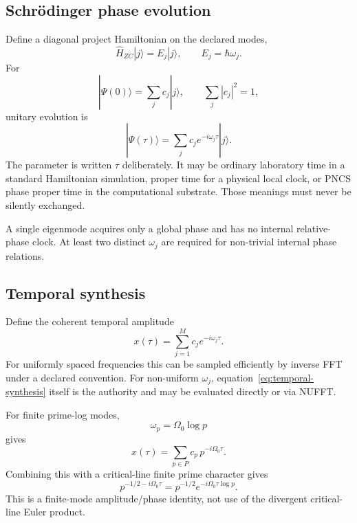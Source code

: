 \subsection{Schrödinger phase evolution}

Define a diagonal project Hamiltonian on the declared modes,
\begin{equation}
\boxed{\hat H_{ZC}|j\rangle=E_j|j\rangle,
\qquad E_j=\hbar\omega_j.}
\end{equation}
For
\begin{equation}
|\Psi(0)\rangle=\sum_j c_j|j\rangle,
\qquad\sum_j|c_j|^2=1,
\end{equation}
unitary evolution is
\begin{equation}
\boxed{
|\Psi(\tau)\rangle
=\sum_j c_j e^{-i\omega_j\tau}|j\rangle.
}
\label{eq:sch-evolution}
\end{equation}
The parameter is written \(\tau\) deliberately. It may be ordinary laboratory time in a standard Hamiltonian simulation, proper time for a physical local clock, or PNCS phase proper time in the computational substrate. Those meanings must never be silently exchanged.

A single eigenmode acquires only a global phase and has no internal relative-phase clock. At least two distinct \(\omega_j\) are required for non-trivial internal phase relations.

\subsection{Temporal synthesis}

Define the coherent temporal amplitude
\begin{equation}
\boxed{x(\tau)=\sum_{j=1}^{M}c_j e^{-i\omega_j\tau}.}
\label{eq:temporal-synthesis}
\end{equation}
For uniformly spaced frequencies this can be sampled efficiently by inverse FFT under a declared convention. For non-uniform \(\omega_j\), equation~\eqref{eq:temporal-synthesis} itself is the authority and may be evaluated directly or via NUFFT.

For finite prime-log modes,
\begin{equation}
\omega_p=\Omega_0\log p
\end{equation}
gives
\begin{equation}
\boxed{x(\tau)=\sum_{p\in P}c_p\,p^{-i\Omega_0\tau}.}
\label{eq:prime-time}
\end{equation}
Combining this with a critical-line finite prime character gives
\begin{equation}
p^{-1/2-i\Omega_0\tau}=p^{-1/2}e^{-i\Omega_0\tau\log p}.
\end{equation}
This is a finite-mode amplitude/phase identity, not use of the divergent critical-line Euler product.

